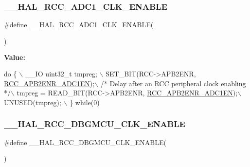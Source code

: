 \subsubsection{\texorpdfstring{\+\_\+\+\_\+\+H\+A\+L\+\_\+\+R\+C\+C\+\_\+\+A\+D\+C1\+\_\+\+C\+L\+K\+\_\+\+E\+N\+A\+B\+LE}{\_\_HAL\_RCC\_ADC1\_CLK\_ENABLE}}
{\footnotesize\ttfamily \#define \+\_\+\+\_\+\+H\+A\+L\+\_\+\+R\+C\+C\+\_\+\+A\+D\+C1\+\_\+\+C\+L\+K\+\_\+\+E\+N\+A\+B\+LE(\begin{DoxyParamCaption}{ }\end{DoxyParamCaption})}

{\bfseries Value\+:}
\begin{DoxyCode}
\textcolor{keywordflow}{do} \{ \(\backslash\)
                                        \_\_IO uint32\_t tmpreg; \(\backslash\)
                                        SET\_BIT(RCC->APB2ENR, \hyperlink{group___peripheral___registers___bits___definition_ga57b9f50cb96a2e4ceba37728b4a32a42}{RCC\_APB2ENR\_ADC1EN});\(\backslash\)
                                        \textcolor{comment}{/* Delay after an RCC peripheral clock enabling */}\(\backslash\)
                                        tmpreg = READ\_BIT(RCC->APB2ENR, 
      \hyperlink{group___peripheral___registers___bits___definition_ga57b9f50cb96a2e4ceba37728b4a32a42}{RCC\_APB2ENR\_ADC1EN});\(\backslash\)
                                        UNUSED(tmpreg); \(\backslash\)
                                      \} \textcolor{keywordflow}{while}(0)
\end{DoxyCode}
\mbox{\label{group___r_c_c___a_p_b2___clock___enable___disable_gaa9ce3b2ed26ac09b874d3a5d8c282a67}} 
\subsubsection{\texorpdfstring{\+\_\+\+\_\+\+H\+A\+L\+\_\+\+R\+C\+C\+\_\+\+D\+B\+G\+M\+C\+U\+\_\+\+C\+L\+K\+\_\+\+E\+N\+A\+B\+LE}{\_\_HAL\_RCC\_DBGMCU\_CLK\_ENABLE}}
{\footnotesize\ttfamily \#define \+\_\+\+\_\+\+H\+A\+L\+\_\+\+R\+C\+C\+\_\+\+D\+B\+G\+M\+C\+U\+\_\+\+C\+L\+K\+\_\+\+E\+N\+A\+B\+LE(\begin{DoxyParamCaption}{ }\end{DoxyParamCaption})}

